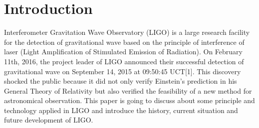 \documentclass[journal,comsoc,twoside]{IEEEtran}
\begin{document}
\section{Introduction}
%
%
%
%
 Interferometer Gravitation Wave Observatory (LIGO) is a large research facility for the detection of gravitational wave based on the principle of interference of laser (Light Amplification of Stimulated Emission of Radiation). On February 11th, 2016, the project leader of LIGO announced their successful detection of gravitational wave on September 14, 2015 at 09:50:45 UCT[1]. This discovery shocked the public because it did not only verify Einstein's prediction in his General Theory of Relativity but also verified the feasibility of a new method for astronomical observation. This paper is going to discuss about some principle and technology applied in LIGO and introduce the history, current situation and future development of LIGO.





%
%
\end{document}
